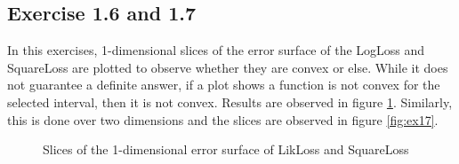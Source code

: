 \documentclass[fleqn]{report}
\begin{document}
\subsection*{Exercise 1.6 and 1.7}
In this exercises, 1-dimensional slices of the error surface of the LogLoss and SquareLoss are plotted to observe whether they are convex or else. While it does not guarantee a definite answer, if a plot shows a function is not convex for the selected interval, then it is not convex. Results are observed in figure \ref{fig:ex16}. Similarly, this is done over two dimensions and the slices are observed in figure \ref{fig:ex17}.
\begin{figure}
    \centering
    \qquad
    \caption{Slices of the 1-dimensional error surface of LikLoss and SquareLoss}
    \label{fig:ex16}
\end{figure}
\end{document}

